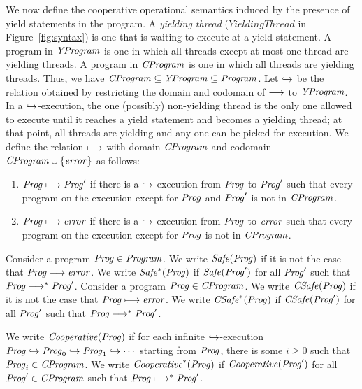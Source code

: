 We now define the cooperative operational semantics induced by the presence of yield statements in the program.
A {\em yielding thread\/} ($\mathit{YieldingThread}$ in Figure~\ref{fig:syntax}) is one that is waiting to execute at a yield statement.
A program in $\mathit{YProgram}$ is one in which all threads except at most one thread are yielding threads.
A program in $\mathit{CProgram}$ is one in which all threads are yielding threads.
Thus, we have $\mathit{CProgram} \subseteq \mathit{YProgram} \subseteq \mathit{Program}$.
Let $\hookrightarrow$ be the relation obtained by restricting the domain and codomain of $\longrightarrow$ to $\mathit{YProgram}$.
In a $\hookrightarrow$-execution, the one (possibly) non-yielding thread is the only one allowed to execute until it reaches 
a yield statement and becomes a yielding thread; at that point, all threads are yielding and any one can be picked for execution.
We define the relation $\longmapsto$ with domain $\mathit{CProgram}$ and codomain $\mathit{CProgram} \cup \{\mathit{error}\}$ as follows:
\begin{enumerate}
\item 
$\mathit{Prog} \longmapsto \mathit{Prog}'$ if there is a $\hookrightarrow$-execution from $\mathit{Prog}$ to $\mathit{Prog}'$ such that every program on the execution 
except for $\mathit{Prog}$ and $\mathit{Prog}'$ is not in $\mathit{CProgram}$.
\item
$\mathit{Prog} \longmapsto \mathit{error}$ if there is a $\hookrightarrow$-execution from $\mathit{Prog}$ to $\mathit{error}$ such that every program on the execution 
except for $\mathit{Prog}$ is not in $\mathit{CProgram}$.
\end{enumerate}

Consider a program $\mathit{Prog} \in \mathit{Program}$.
We write $\mathit{Safe}(\mathit{Prog})$ if it is not the case that $\mathit{Prog} \longrightarrow \mathit{error}$.
We write $\mathit{Safe}^*(\mathit{Prog})$ if $\mathit{Safe}(\mathit{Prog}')$ for all $\mathit{Prog}'$ such that $\mathit{Prog} \longrightarrow^* \mathit{Prog}'$.
Consider a program $\mathit{Prog} \in \mathit{CProgram}$.
We write $\mathit{CSafe}(\mathit{Prog})$ if it is not the case that $\mathit{Prog} \longmapsto \mathit{error}$.
We write $\mathit{CSafe}^*(\mathit{Prog})$ if $\mathit{CSafe}(\mathit{Prog}')$ for all $\mathit{Prog}'$ such that $\mathit{Prog} \longmapsto^* \mathit{Prog}'$.

We write $\mathit{Cooperative}(\mathit{Prog})$ if for each infinite $\hookrightarrow$-execution $\mathit{Prog} \hookrightarrow \mathit{Prog}_0 \hookrightarrow \mathit{Prog}_1 \hookrightarrow \cdots$ 
starting from $\mathit{Prog}$, there is some $i \geq 0$ such that $\mathit{Prog}_i \in \mathit{CProgram}$.
We write $\mathit{Cooperative}^*(\mathit{Prog})$ if $\mathit{Cooperative}(\mathit{Prog}')$ for all $\mathit{Prog}' \in \mathit{CProgram}$ such that $\mathit{Prog} \longmapsto^* \mathit{Prog}'$.
